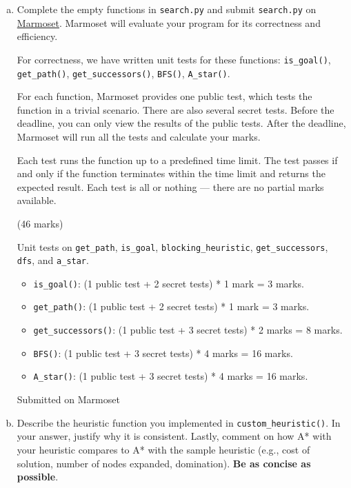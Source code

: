\documentclass[12pt]{article}
\begin{document}
\begin{enumerate}[(a)]

\item Complete the empty functions in \verb+search.py+ and submit \verb+search.py+ on \href{https://marmoset.student.cs.uwaterloo.ca/}{Marmoset}. Marmoset will evaluate your program for its correctness and efficiency.

For correctness, we have written unit tests for these functions: \verb+is_goal()+, \verb+get_path()+, \verb+get_successors()+, \verb+BFS()+, \verb+A_star()+.

For each function, Marmoset provides one public test, which tests the function in a trivial scenario. There are also several secret tests. Before the deadline, you can only view the results of the public tests. After the deadline, Marmoset will run all the tests and calculate your marks.

Each test runs the function up to a predefined time limit. The test passes if and only if the function terminates within the time limit and returns the expected result. Each test is all or nothing --- there are no partial marks available.

\begin{markscheme}
(46 marks) 

Unit tests on \verb+get_path+, \verb+is_goal+, \verb+blocking_heuristic+, \verb+get_successors+, \verb+dfs+, and \verb+a_star+. 

\begin{itemize}
\item \verb+is_goal()+:  (1 public test + 2 secret tests) * 1 mark = 3 marks.
\item \verb+get_path()+: (1 public test + 2 secret tests) * 1 mark = 3 marks.
\item \verb+get_successors()+: (1 public test + 3 secret tests) * 2 marks = 8 marks.
\item \verb+BFS()+:    (1 public test + 3 secret tests) * 4 marks = 16 marks.
\item \verb+A_star()+: (1 public test + 3 secret tests) * 4 marks = 16 marks.
\end{itemize}

\end{markscheme}

\begin{sol}
{\color{blue}
 Submitted on Marmoset}
\end{sol}
  
\item Describe the heuristic function you implemented in \verb+custom_heuristic()+. In your answer, justify why it is consistent. Lastly, comment on how A* with your heuristic compares to A* with the sample heuristic (e.g., cost of solution, number of nodes expanded, domination). \textbf{Be as concise as possible}.


\end{enumerate}
\end{document}
